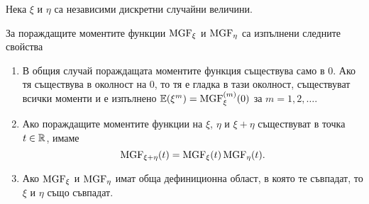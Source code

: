 \documentclass[numbers=endperiod, DIV=15, bibliography=totocnumbered]{scrartcl}
\begin{document}
\begin{theorem}
  Нека $\xi$ и $\eta$ са независими дискретни случайни величини.

  За пораждащите моментите функции $\operatorname{MGF}_\xi$ и $\operatorname{MGF}_\eta$ са изпълнени следните свойства
  \begin{enumerate}
    \item В общия случай пораждащата моментите функция съществува само в $0$. Ако тя съществува в околност на $0$, то тя е гладка в тази околност, съществуват всички моменти и е изпълнено $\mathbb{E}(\xi^m) = \operatorname{MGF}_\xi^{(m)} (0)$ за $m = 1, 2, \ldots$.

    \item Ако пораждащите моментите функции на $\xi$, $\eta$ и $\xi + \eta$ съществуват в точка $t \in \mathbb{R}$, имаме
    \begin{displaymath}
      \operatorname{MGF}_{\xi + \eta}(t) = \operatorname{MGF}_\xi(t) \operatorname{MGF}_\eta(t).
    \end{displaymath}

    \item Ако $\operatorname{MGF}_\xi$ и $\operatorname{MGF}_\eta$ имат обща дефиниционна област, в която те съвпадат, то $\xi$ и $\eta$ също съвпадат.
  \end{enumerate}
\end{theorem}
\end{document}
